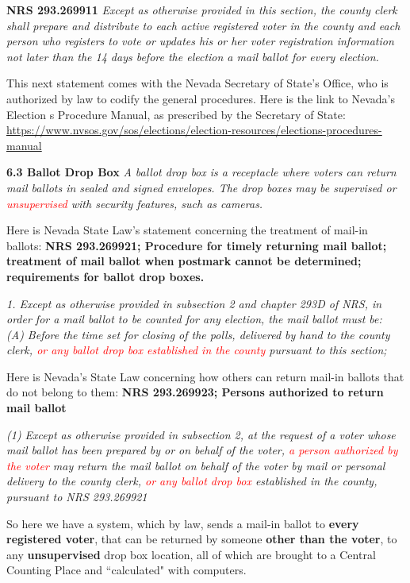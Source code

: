 \documentclass[preprint,13pt]{elsarticle}
\begin{document}
\textbf{NRS 293.269911} \textit{Except as otherwise provided in this section, the county clerk shall prepare and distribute to each active registered voter in the county and each person who registers to vote or updates his or her voter registration information not later than the 14 days before the election a mail ballot for every election.}

This next statement comes with the Nevada Secretary of State's Office, who is authorized by law to codify the general procedures. Here is the link to Nevada's Election s Procedure Manual, as prescribed by the Secretary of State: \url{https://www.nvsos.gov/sos/elections/election-resources/elections-procedures-manual}

\textbf{6.3 Ballot Drop Box} \textit{A ballot drop box is a receptacle where voters can return mail ballots in sealed and signed envelopes. The drop
boxes may be supervised or \textcolor{red}{unsupervised} with security features, such as cameras.}

Here is Nevada State Law's statement concerning the treatment of mail-in ballots:
\textbf{NRS 293.269921; Procedure for timely returning mail ballot; treatment of mail ballot when postmark cannot be determined; requirements for ballot drop boxes.}

\textit{1. Except as otherwise provided in subsection 2 and chapter 293D of NRS, in order for a mail ballot to be counted for any election, the mail ballot must be:}\\
\textit{(A) Before the time set for closing of the polls, delivered by hand to the county clerk, \textcolor{red}{or any ballot drop box established in the county} pursuant to this section;}

Here is Nevada's State Law concerning how others can return mail-in ballots that do not belong to them: \textbf{NRS 293.269923; Persons authorized to return mail ballot}

\textit{(1) Except as otherwise provided in subsection 2, at the request of a voter whose mail ballot has been prepared by or on behalf of the voter, \textcolor{red}{a person authorized by the voter} may return the mail ballot on behalf of the voter by mail or personal delivery to the county clerk, \textcolor{red}{or any ballot drop box} established in the county, pursuant to NRS 293.269921}

So here we have a system, which by law, sends a mail-in ballot to \textbf{every registered voter}, that can be returned by someone \textbf{other than the voter}, to any \textbf{unsupervised} drop box location, all of which are brought to a Central Counting Place and ``calculated" with computers.
\end{document}
